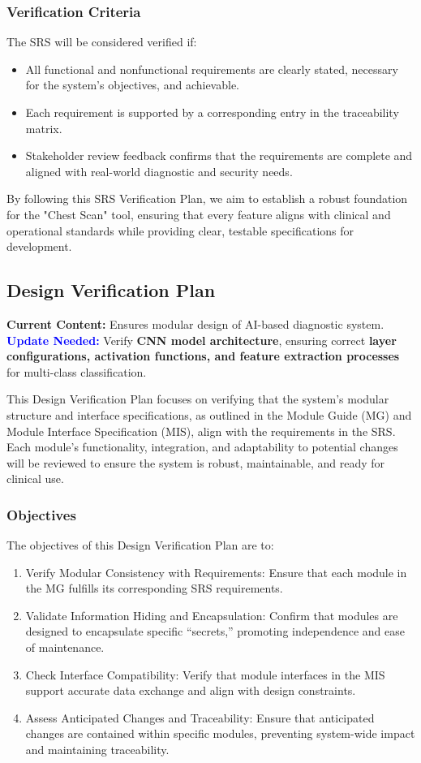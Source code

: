\documentclass[12pt, titlepage]{article}
\begin{document}
\subsubsection{Verification Criteria}
The SRS will be considered verified if:
\begin{itemize}
  \item All functional and nonfunctional requirements are clearly stated, necessary for the system’s objectives, and achievable.
  \item Each requirement is supported by a corresponding entry in the traceability matrix.
  \item Stakeholder review feedback confirms that the requirements are complete and aligned with real-world diagnostic and security needs.
\end{itemize}
By following this SRS Verification Plan, we aim to establish a robust foundation for the "Chest Scan" tool, ensuring that every feature aligns with clinical and operational standards while providing clear, testable specifications for development.

\subsection{Design Verification Plan}

\textbf{Current Content:} Ensures modular design of AI-based diagnostic system. \\
\textbf{\textcolor{blue}{Update Needed:}} Verify \textbf{CNN model architecture}, ensuring correct \textbf{layer configurations, activation functions, and feature extraction processes} for multi-class classification.

This Design Verification Plan focuses on verifying that the system’s modular structure and interface specifications, as outlined in the Module Guide (MG) and Module Interface Specification (MIS), align with the requirements in the SRS. Each module’s functionality, integration, and adaptability to potential changes will be reviewed to ensure the system is robust, maintainable, and ready for clinical use.

\subsubsection{Objectives}
The objectives of this Design Verification Plan are to:
\begin{enumerate}
  \item Verify Modular Consistency with Requirements: Ensure that each module in the MG fulfills its corresponding SRS requirements.
  \item Validate Information Hiding and Encapsulation: Confirm that modules are designed to encapsulate specific “secrets,” promoting independence and ease of maintenance.
  \item Check Interface Compatibility: Verify that module interfaces in the MIS support accurate data exchange and align with design constraints.
  \item Assess Anticipated Changes and Traceability: Ensure that anticipated changes are contained within specific modules, preventing system-wide impact and maintaining traceability.
\end{enumerate}
\end{document}
